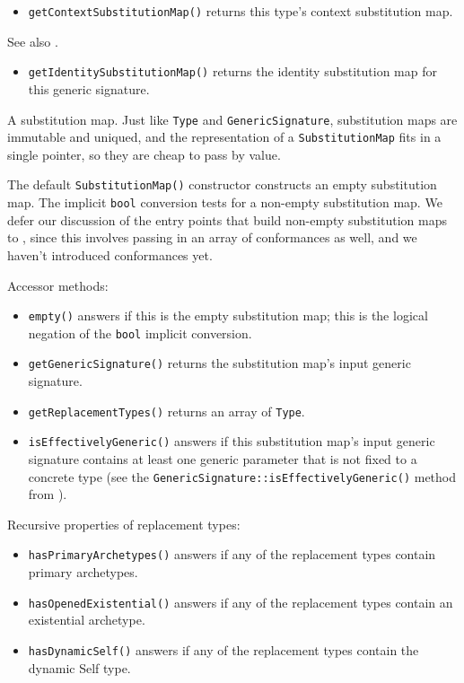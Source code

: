 \documentclass[../generics]{subfiles}
\begin{document}
\begin{itemize}
\item \texttt{getContextSubstitutionMap()} returns this type's context substitution map.
\end{itemize}

See also .
\begin{itemize}
\item \texttt{getIdentitySubstitutionMap()} returns the identity substitution map for this generic signature.
\end{itemize}

A substitution map. Just like \texttt{Type} and \texttt{GenericSignature}, substitution maps are immutable and uniqued, and the representation of a \texttt{SubstitutionMap} fits in a single pointer, so they are cheap to pass by value.

The default \texttt{SubstitutionMap()} constructor constructs an empty substitution map. The implicit \texttt{bool} conversion tests for a non-empty substitution map. We defer our discussion of the entry points that build non-empty substitution maps to , since this involves passing in an array of conformances as well, and we haven't introduced conformances yet.

Accessor methods:
\begin{itemize}
\item \texttt{empty()} answers if this is the empty substitution map; this is the logical negation of the \texttt{bool} implicit conversion.
\item \texttt{getGenericSignature()} returns the substitution map's input generic signature.
\item \texttt{getReplacementTypes()} returns an array of \texttt{Type}.
\item \texttt{isEffectivelyGeneric()} answers if this substitution map's input generic signature contains at least one generic parameter that is not fixed to a concrete type (see the \texttt{GenericSignature::isEffectivelyGeneric()} method from ).
\end{itemize}

Recursive properties of replacement types:
\begin{itemize}
\item \texttt{hasPrimaryArchetypes()} answers if any of the replacement types contain primary archetypes.
\item \texttt{hasOpenedExistential()} answers if any of the replacement types contain an existential archetype.
\item \texttt{hasDynamicSelf()} answers if any of the replacement types contain the dynamic Self type.
\end{itemize}
\end{document}
